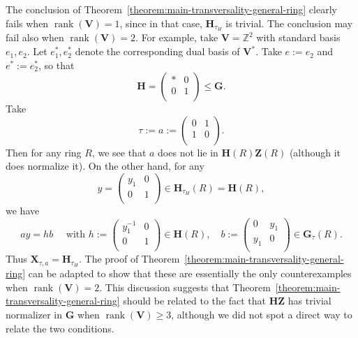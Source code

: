 \documentclass[reqno]{amsart}
\DeclareMathOperator{\rank}{rank}
\theoremstyle{plain} \newtheorem{theorem} {Theorem} \newtheorem{conjecture} {Conjecture} \newtheorem{corollary} [theorem] {Corollary} \newtheorem{proposition} [theorem] {Proposition} \newtheorem{fact} [theorem] {Fact}
\theoremstyle{definition} \newtheorem{definition} [theorem] {Definition}
\theoremstyle{itplain} %
\begin{document}
\begin{remark}
  The conclusion of Theorem~\ref{theorem:main-transversality-general-ring} clearly fails when $\rank(\mathbf{V}) = 1$, since in that case, $\mathbf{H}_{\tau_H}$ is trivial.  The conclusion may fail also when $\rank(\mathbf{V}) = 2$.  For example, take $\mathbf{V} = \mathbb{Z}^2$ with standard basis $e_1,e_2$.  Let $e_1^*,e_2^*$ denote the corresponding dual basis of $\mathbf{V}^*$.  Take $e := e_2$ and $e^* := e_2^*$, so that
  \begin{equation*}
    \mathbf{H} =
    \begin{pmatrix}
      \ast & 0 \\
      0 & 1 \\
    \end{pmatrix} \leq \mathbf{G}.
  \end{equation*}
  Take
  \begin{equation*}
    \tau := a :=
    \begin{pmatrix}
      0 & 1 \\
      1 & 0 \\
    \end{pmatrix}.
  \end{equation*}
  Then for any ring $R$, we see that $a$ does not lie in $\mathbf{H}(R) \mathbf{Z}(R)$ (although it does normalize it).  On the other hand, for any
  \begin{equation*}
    y
    =
    \begin{pmatrix}
      y_1 & 0 \\
      0 & 1 \\
    \end{pmatrix}
    \in \mathbf{H}_{\tau_H}(R) = \mathbf{H}(R),
  \end{equation*}
  we have
  \begin{equation*}
    a y = h b \quad \text{ with }
    h :=
    \begin{pmatrix}
      y_1^{-1} & 0 \\
      0 & 1 \\
    \end{pmatrix} \in \mathbf{H}(R),
    \quad
    b :=
    \begin{pmatrix}
      0 & y_1 \\
      y_1 & 0 \\
    \end{pmatrix} \in \mathbf{G}_\tau(R).    
  \end{equation*}
  Thus $\mathbf{X}_{\tau,a} = \mathbf{H}_{\tau_H}$.  The proof of Theorem~\ref{theorem:main-transversality-general-ring} can be adapted to show that these are essentially the only counterexamples when $\rank(\mathbf{V}) = 2$.  This discussion suggests that Theorem~\ref{theorem:main-transversality-general-ring} should be related to the fact that $\mathbf{H} \mathbf{Z}$ has trivial normalizer in $\mathbf{G}$ when $\rank(\mathbf{V}) \geq 3$, although we did not spot a direct way to relate the two conditions.
\end{remark}
\end{document}
